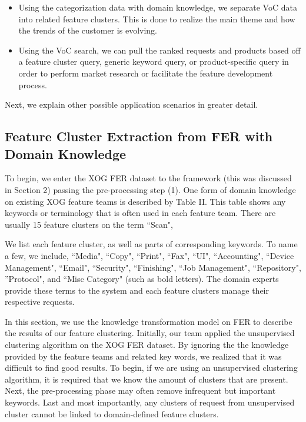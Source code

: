 \documentclass[sigconf]{acmart}
\begin{document}
\begin{itemize}
    \item Using the categorization data with domain knowledge, we separate VoC data into related feature clusters. This is done to realize the main theme and how the trends of the customer is evolving. 
    \item Using the VoC search, we can pull the ranked requests and products based off a feature cluster query, generic keyword query, or product-specific query in order to perform market research or facilitate the feature development process. 
\end{itemize}

Next, we explain other possible application scenarios in greater detail. 

\subsection{Feature Cluster Extraction from FER with Domain Knowledge}
To begin, we enter the XOG FER dataset to the framework (this was discussed in Section 2) passing the pre-processing step (1). One form of domain knowledge on existing XOG feature teams is described by Table II. This table shows any keywords or terminology that is often used in each feature team. There are usually 15 feature clusters on the term ``Scan", 

We list each feature cluster, as well as parts of corresponding keywords. To name a few, we include, ``Media", ``Copy", ``Print", ``Fax", ``UI", ``Accounting", ``Device Management", ``Email", ``Security", ``Finishing", ``Job Management", ``Repository", ''Protocol", and ``Misc Category" (such as bold letters). The domain experts provide these terms to the system and each feature clusters manage their respective requests. 

In this section, we use the knowledge transformation model on FER to describe the results of our feature clustering. Initially, our team applied the unsupervised clustering algorithm on the XOG FER dataset. By ignoring the the knowledge provided by the feature teams and related key words, we realized that it was difficult to find good results. To begin, if we are using an unsupervised clustering algorithm, it is required that we know the amount of clusters that are present. Next, the pre-processing phase may often remove infrequent but important keywords. Last and most importantly, any clusters of request from unsupervised cluster cannot be linked to domain-defined feature clusters.
\end{document}
